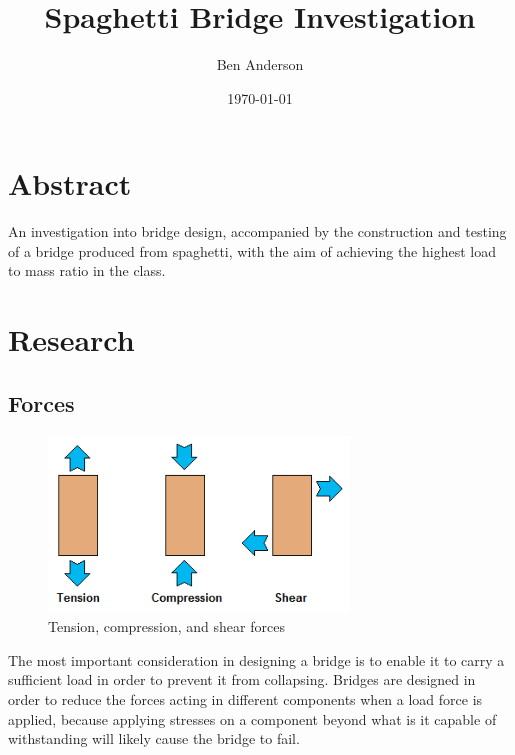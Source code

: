 \documentclass[a4paper,11pt]{article}
\begin{document}
\title{Spaghetti Bridge Investigation}
\author{Ben Anderson}
\date{\today}
\maketitle

\pagebreak

\tableofcontents
\pagebreak


\section{Abstract}

An investigation into bridge design, accompanied by the construction and testing
of a bridge produced from spaghetti, with the aim of achieving the highest load
to mass ratio in the class.




\section{Research}

\subsection{Forces}

\begin{figure}
\begin{center}
\includegraphics[width=8cm]{figures/forces.png}
\end{center}
\caption{Tension, compression, and shear forces}
\label{research:forces}
\end{figure}

The most important consideration in designing a bridge is to enable it to
carry a sufficient load in order to prevent it from collapsing.
Bridges are designed in order to reduce the forces acting in different
components when a load force is applied, because applying stresses on a
component beyond what is it capable of withstanding will likely cause the bridge
to fail.
\end{document}
